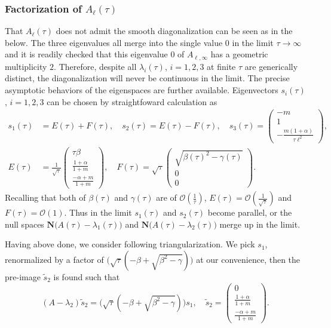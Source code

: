 \documentclass[a4paper,11pt]{article}
\def\l{{\ell}}
\theoremstyle{remark}
\begin{document}
\subsubsection{Factorization of $A_\ell(\tau)$}
That $A_\ell(\tau)$ does not admit the smooth diagonalization can be seen as in the below. The three eigenvalues all merge into the single value $0$ in the limit $\tau \rightarrow \infty$ and it is readily checked that this eigenvalue $0$ of $A_{\ell,\infty}$ has a geometric multiplicity $2$. Therefore, despite all $\lambda_i(\tau)$, $i=1,2,3$ at finite $\tau$ are generically distinct, the diagonalization will never be continuous in the limit.
The precise asymptotic behaviors of the eigenspaces are further available. %
Eigenvectors $s_i(\tau)$, $i=1,2,3$ can be chosen by straightfoward calculation as
\begin{align*}
 s_1(\tau)&=E(\tau) + F(\tau), \quad s_2(\tau)=E(\tau)-F(\tau), \quad s_3(\tau) = \begin{pmatrix} -m\\1\\ -\frac{m(1+\alpha)}{\tau\l^2} \end{pmatrix},\\
 E(\tau) &= \frac{1}{\sqrt{\tau}} \begin{pmatrix} \tau\beta \\ \frac{1+\alpha}{1+m} \\ \frac{-\alpha+m}{1+m} \end{pmatrix}, \quad  F(\tau)= \sqrt{\tau}\begin{pmatrix}  \sqrt{\beta(\tau)^2-\gamma(\tau)}\\0\\0 \end{pmatrix}.
\end{align*}
Recalling that both of $\beta(\tau)$ and $\gamma(\tau)$ are of $\mathcal{O}(\frac{1}{\tau})$, $E(\tau)=\mathcal{O}(\frac{1}{\sqrt{\tau}})$ and $F(\tau)=\mathcal{O}(1)$. Thus in the limit $s_1(\tau)$ and $s_2(\tau)$ become parallel, or the null spaces $\mathbf{N}\Big(A(\tau) - \lambda_1(\tau)\Big)$ and $\mathbf{N}\Big(A(\tau) - \lambda_2(\tau)\Big)$ merge up in the limit.

Having above done, we consider following triangularization. We pick $s_1$, renormalized by a factor of $\Big(\sqrt{\tau}(-\beta+\sqrt{\beta^2-\gamma})\Big)$ at our convenience, then the pre-image $\tilde s_2$ is found such that
$$ (A-\lambda_2) \tilde s_2 = \Big(\sqrt{\tau}(-\beta+\sqrt{\beta^2-\gamma})\Big)s_1, \quad \text{$\tilde s_2 = \begin{pmatrix}  0 \\ \tfrac{1+\alpha}{1+m} \\ \tfrac{-\alpha+m}{1+m} \end{pmatrix}$}.$$
\end{document}
